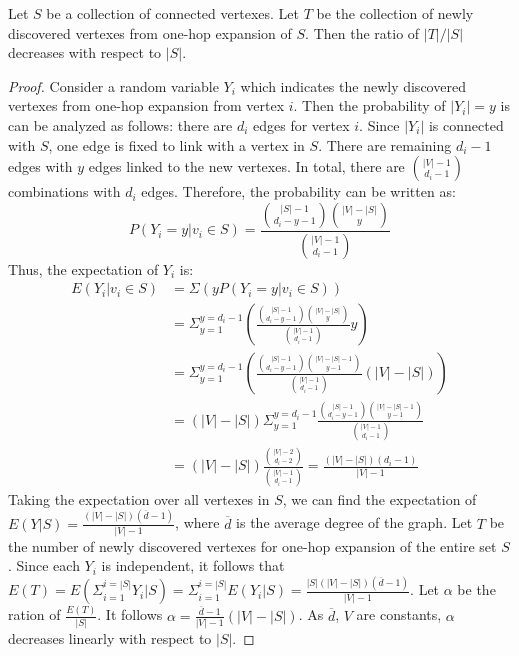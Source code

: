 \begin{theorem}
Let $S$ be a collection of connected vertexes. Let $T$ be the collection
of newly discovered vertexes from one-hop expansion of $S$. Then the ratio of 
$|T|/|S|$ decreases with respect to $|S|$.
\end{theorem}
\begin{proof}

Consider a random variable $Y_i$ which indicates the newly 
discovered vertexes from one-hop expansion from vertex $i$. 
Then the probability of $|Y_i|=y$ is can be analyzed as follows: there 
are $d_i$ edges for vertex $i$. Since $|Y_i|$ is connected with $S$, one edge
is fixed to link with a vertex in $S$. There are remaining $d_i-1$ edges with
$y$ edges linked to the new vertexes. In total, there are $|V|-1 \choose d_i -1$
combinations with $d_i$ edges. Therefore, the probability can be written as:
\begin{equation}
P(Y_i = y| v_i \in S) = \frac{{|S| -1 \choose d_i - y -1}{|V|-|S| \choose y}}{{|V|-1 \choose d_i -1}}
\end{equation}
Thus, the expectation of $Y_i$ is:
\begin{equation}
\begin{split}
E(Y_i|v_i \in S) & = \Sigma( y P(Y_i = y| v_i \in S) )\\
	& = \Sigma_{y=1}^{y=d_i -1} ( \frac{{|S| -1 \choose d_i - y -1}{|V|-|S| \choose y}}{{|V|-1 \choose d_i -1}} y )\\
	& = \Sigma_{y=1}^{y=d_i -1} (\frac{{|S| -1 \choose d_i - y -1}{|V|-|S| -1 \choose y - 1}}{{|V|-1 \choose d_i -1}}  (|V|-|S|))\\
	& = (|V|-|S|)  \Sigma_{y=1}^{y=d_i -1}\frac{{|S| -1 \choose d_i - y -1}{|V|-|S| -1 \choose y - 1}}{{|V|-1 \choose d_i -1}} \\
	& = (|V|-|S|)  \frac{{|V|-2 \choose d_i - 2}}{{|V|-1 \choose d_i -1}} = \frac{(|V|-|S|)(d_i-1)}{|V| - 1}
\end{split}
\end{equation}
Taking the expectation over all vertexes in $S$, we can find the expectation of $E(Y|S) = \frac{(|V|-|S|)(\overline{d}-1)}{|V| - 1}$,
where $\overline{d}$ is the average degree of the graph. Let %
$T$ be the number of newly discovered vertexes for one-hop expansion of the entire set $S$.  
Since each $Y_i$ is independent,
it follows that $E(T) = E(\Sigma_{i=1}^{i=|S|}Y_i|S) = \Sigma_{i=1}^{i=|S|}E(Y_i|S) = \frac{|S|(|V|-|S|)(\overline{d} -1)}{|V|-1}$.  Let $\alpha$ be the ration of $\frac{E(T)}{|S|}$. It follows 
$\alpha= \frac{\overline{d}-1}{|V|-1}(|V|-|S|)$. As $\overline{d}$, $V$ are constants, $\alpha$ decreases linearly with respect to $|S|$.
\end{proof}

